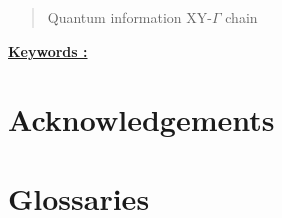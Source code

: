 \pagestyle{romanstyle}
\begin{abstract}
	\lipsum[1] %

    Quantum information XY-$\Gamma$ chain 

\end{abstract}

\underline{\textbf{Keywords :}}

\newpage
\section*{Acknowledgements}
\newpage



\newpage

		
\startcontents[sections]

\newpage

		\listoffigures

\newpage
		
		\listoftables

\newpage

\section*{Glossaries}

\newpage